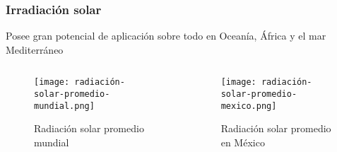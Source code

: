 \begin{frame}
    \frametitle{Irradiación solar}
    
    Posee gran potencial de aplicación sobre todo en Oceanía, África y el mar Mediterráneo
    
    \begin{columns}
        \begin{column}[b]{0.5\textwidth}
            \begin{figure}
                \centering
                \texttt{[image: radiación-solar-promedio-mundial.png]}
                \caption{Radiación solar promedio mundial}
            \end{figure}	
        \end{column}
        \begin{column}[b]{0.5\textwidth}
            \begin{figure}
                \centering
                \texttt{[image: radiación-solar-promedio-mexico.png]}
                \caption{Radiación solar promedio en México}
            \end{figure}
        \end{column}
    \end{columns}
\end{frame}